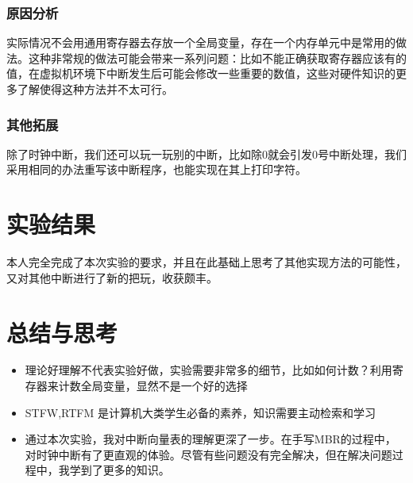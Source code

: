 \documentclass{LabReport}
\begin{document}
	\subsubsection{原因分析}
	实际情况不会用通用寄存器去存放一个全局变量，存在一个内存单元中是常用的做法。这种非常规的做法可能会带来一系列问题：比如不能正确获取寄存器应该有的值，在虚拟机环境下中断发生后可能会修改一些重要的数值，这些对硬件知识的更多了解使得这种方法并不太可行。
	
	\subsubsection{其他拓展}
	除了时钟中断，我们还可以玩一玩别的中断，比如除0就会引发0号中断处理，我们采用相同的办法重写该中断程序，也能实现在其上打印字符。
	
	\section{实验结果}
	本人完全完成了本次实验的要求，并且在此基础上思考了其他实现方法的可能性，又对其他中断进行了新的把玩，收获颇丰。
	
	\section{总结与思考}
	\begin{itemize}
		\item 理论好理解不代表实验好做，实验需要非常多的细节，比如如何计数？利用寄存器来计数全局变量，显然不是一个好的选择
		\item STFW,RTFM 是计算机大类学生必备的素养，知识需要主动检索和学习
		\item 通过本次实验，我对中断向量表的理解更深了一步。在手写MBR的过程中，对时钟中断有了更直观的体验。尽管有些问题没有完全解决，但在解决问题过程中，我学到了更多的知识。
	\end{itemize}
	
\end{document}

